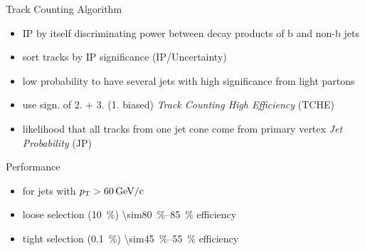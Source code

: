 \begin{frame}{Track Counting Algorithm}

	\begin{itemize}\itemfill
		\item IP by itself discriminating power between decay products of b and non-b jets
		\item sort tracks by IP significance (IP/Uncertainty)
		\item low probability to have several jets with high significance from light partons
		\item use sign. of 2. + 3. (1. biased) \ra \textit{Track Counting High Efficiency} (TCHE)
		\item likelihood that all tracks from one jet cone come from primary vertex \ra \textit{Jet Probability} (JP)
	\end{itemize}
	

\end{frame}
\begin{frame}{Performance}

	\vspace*{-15pt} \vspace*{-10pt} 
	
	\begin{itemize}\itemfill
		\item for jets with $p_{\text{T}}>\SI{60}{\giga\electronvolt\per c}$
		\item loose selection (\SI{10}{\%}) \ra \SIrange{\sim80}{85}{\%} efficiency
		\item tight selection (\SI{.1}{\%}) \ra \SIrange{\sim45}{55}{\%} efficiency
	\end{itemize}

\end{frame}
